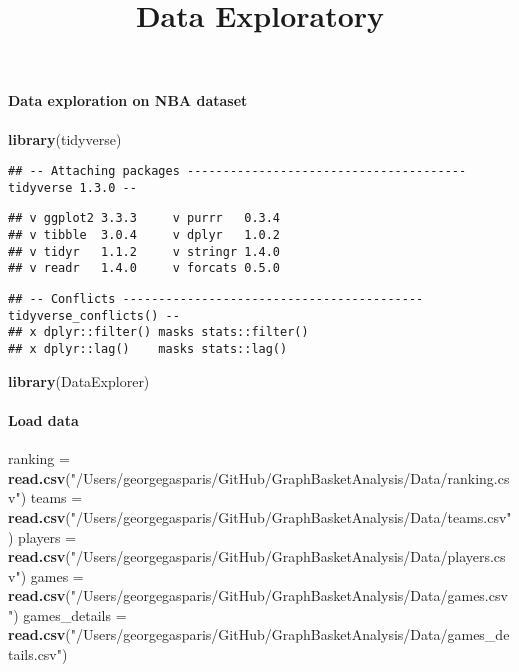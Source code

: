 \documentclass[
]{article}
\title{Data Exploratory}
\author{}
\date{\vspace{-2.5em}}
\newenvironment{Shaded}{\begin{snugshade}}{\end{snugshade}}
\newcommand{\KeywordTok}[1]{\textcolor[rgb]{0.13,0.29,0.53}{\textbf{#1}}}
\newcommand{\NormalTok}[1]{#1}
\newcommand{\StringTok}[1]{\textcolor[rgb]{0.31,0.60,0.02}{#1}}
\begin{document}
\maketitle

\hypertarget{data-exploration-on-nba-dataset}{%
\paragraph{Data exploration on NBA
dataset}\label{data-exploration-on-nba-dataset}}

\begin{Shaded}
\begin{Highlighting}[]
\KeywordTok{library}\NormalTok{(tidyverse)}
\end{Highlighting}
\end{Shaded}

\begin{verbatim}
## -- Attaching packages --------------------------------------- tidyverse 1.3.0 --
\end{verbatim}

\begin{verbatim}
## v ggplot2 3.3.3     v purrr   0.3.4
## v tibble  3.0.4     v dplyr   1.0.2
## v tidyr   1.1.2     v stringr 1.4.0
## v readr   1.4.0     v forcats 0.5.0
\end{verbatim}

\begin{verbatim}
## -- Conflicts ------------------------------------------ tidyverse_conflicts() --
## x dplyr::filter() masks stats::filter()
## x dplyr::lag()    masks stats::lag()
\end{verbatim}

\begin{Shaded}
\begin{Highlighting}[]
\KeywordTok{library}\NormalTok{(DataExplorer)}
\end{Highlighting}
\end{Shaded}

\hypertarget{load-data}{%
\paragraph{Load data}\label{load-data}}

\begin{Shaded}
\begin{Highlighting}[]
\NormalTok{ranking =}\StringTok{ }\KeywordTok{read.csv}\NormalTok{(}\StringTok{"/Users/georgegasparis/GitHub/GraphBasketAnalysis/Data/ranking.csv"}\NormalTok{)}
\NormalTok{teams =}\StringTok{ }\KeywordTok{read.csv}\NormalTok{(}\StringTok{"/Users/georgegasparis/GitHub/GraphBasketAnalysis/Data/teams.csv"}\NormalTok{)}
\NormalTok{players =}\StringTok{ }\KeywordTok{read.csv}\NormalTok{(}\StringTok{"/Users/georgegasparis/GitHub/GraphBasketAnalysis/Data/players.csv"}\NormalTok{)}
\NormalTok{games =}\StringTok{ }\KeywordTok{read.csv}\NormalTok{(}\StringTok{"/Users/georgegasparis/GitHub/GraphBasketAnalysis/Data/games.csv"}\NormalTok{)}
\NormalTok{games\_details =}\StringTok{ }\KeywordTok{read.csv}\NormalTok{(}\StringTok{"/Users/georgegasparis/GitHub/GraphBasketAnalysis/Data/games\_details.csv"}\NormalTok{)}
\end{Highlighting}
\end{Shaded}
\end{document}
